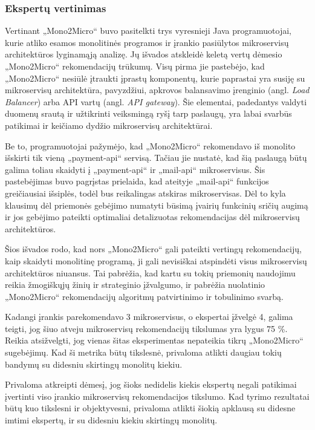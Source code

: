 \documentclass{VUMIFPSbakalaurinis}
\begin{document}
\subsubsection{Ekspertų vertinimas}
Vertinant „Mono2Micro“ buvo pasitelkti trys vyresnieji Java programuotojai, kurie atliko esamos monolitinės programos ir įrankio pasiūlytos mikroservisų architektūros lyginamąją analizę. Jų išvados atskleidė keletą vertų dėmesio „Mono2Micro“ rekomendacijų trūkumų. Visų pirma jie pastebėjo, kad „Mono2Micro“ nesiūlė įtraukti įprastų komponentų, kurie paprastai yra susiję su mikroservisų architektūra, pavyzdžiui, apkrovos balansavimo įrenginio (angl. \emph{Load Balancer}) arba API vartų (angl. \emph{API gateway}). Šie elementai, padedantys valdyti duomenų srautą ir užtikrinti veiksmingą ryšį tarp paslaugų, yra labai svarbūs patikimai ir keičiamo dydžio mikroservisų architektūrai.

Be to, programuotojai pažymėjo, kad „Mono2Micro“ rekomendavo iš monolito išskirti tik vieną „payment-api“ servisą. Tačiau jie nustatė, kad šią paslaugą būtų galima toliau skaidyti į „payment-api“ ir „mail-api“ mikroservisus. Šis pastebėjimas buvo pagrįstas prielaida, kad ateityje „mail-api“ funkcijos greičiausiai išsiplės, todėl bus reikalingas atskiras mikroservisas. Dėl to kyla klausimų dėl priemonės gebėjimo numatyti būsimą įvairių funkcinių sričių augimą ir jos gebėjimo pateikti optimaliai detalizuotas rekomendacijas dėl mikroservisų architektūros.

Šios išvados rodo, kad nors „Mono2Micro“ gali pateikti vertingų rekomendacijų, kaip skaidyti monolitinę programą, ji gali nevisiškai atspindėti visus mikroservisų architektūros niuansus. Tai pabrėžia, kad kartu su tokių priemonių naudojimu reikia žmogiškųjų žinių ir strateginio įžvalgumo, ir pabrėžia nuolatinio „Mono2Micro“ rekomendacijų algoritmų patvirtinimo ir tobulinimo svarbą.

Kadangi įrankis parekomendavo 3 mikroservisus, o ekspertai įžvelgė 4, galima teigti, jog šiuo atveju mikroservisų rekomendacijų tikslumas yra lygus 75 \%. Reikia atsižvelgti, jog vienas šitas eksperimentas nepateikia tikrų „Mono2Micro“ sugebėjimų. Kad ši metrika būtų tikslesnė, privaloma atlikti daugiau tokių bandymų su didesniu skirtingų monolitų kiekiu.

Privaloma atkreipti dėmesį, jog šioks nedidelis kiekis ekspertų negali patikimai įvertinti viso įrankio mikroservisų rekomendacijos tikslumo. Kad tyrimo rezultatai būtų kuo tikslesni ir objektyvesni, privaloma atlikti šiokią apklausą su didesne imtimi ekspertų, ir su didesniu kiekiu skirtingų monolitų.
\end{document}
